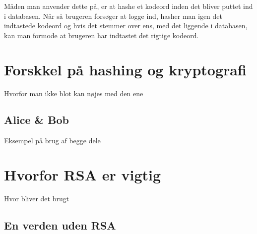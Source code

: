 \documentclass[a4paper, 12pt]{article}
\theoremstyle{break}
\begin{document}
    \noindent
    Måden man anvender dette på, er at hashe et kodeord inden det bliver puttet ind i databasen.
    Når så brugeren forsøger at logge ind, hasher man igen det indtastede kodeord og hvis det stemmer over ens, med det liggende i databasen, kan man formode at brugeren har indtastet det rigtige kodeord.




\section{Forskkel på hashing og kryptografi}
Hvorfor man ikke blot kan nøjes med den ene

    \subsection{Alice \& Bob}
    Eksempel på brug af begge dele



\section{Hvorfor RSA er vigtig}
Hvor bliver det brugt

    \subsection{En verden uden RSA}





\newpage
\printbibliography[heading=bibintoc, title={Litteratur}]
\end{document}
